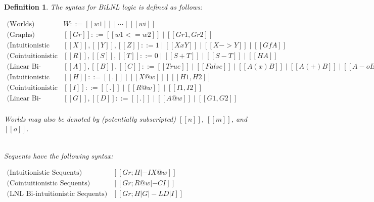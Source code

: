 \documentclass{lmcs}
\newtheorem{definition}[theorem]{Definition}
\begin{document}
\begin{definition}
  \label{def:BiLNL-syntax}
  The syntax for BiLNL logic is defined as follows:
  \begin{center}
    \begin{math}
      \begin{array}{rlllllllllll}
        \text{(Worlds)} & W ::= [[w1]] \mid \cdots \mid [[wi]]\\
        \text{(Graphs)} & [[Gr]] ::= [[w1 <= w2]] \mid [[Gr1 , Gr2]]\\
        \text{(Intuitionistic Formulas)} & [[X]], [[Y]], [[Z]] ::= 1
          \mid [[X x Y]] \mid [[X -> Y]] \mid [[Gf A]]\\
        \text{(Cointuitionistic Formulas)} &  [[R]], [[S]], [[T]] ::= 0 \mid [[S + T]] \mid [[S - T]] \mid [[H A]]\\
        \text{(Linear Bi-intuitionistic Formulas)} &
             [[A]],[[B]],[[C]] ::= [[True]] \mid [[False]] \mid
             [[A (x) B]] \mid [[A (+) B]] \mid
             [[A -o B]] \mid [[A *- B]] \mid [[F X]] \mid [[J S]]\\
             \text{(Intuitionistic Contexts)}  & [[H]] ::= [[.]] \mid
                  [[X @ w]] \mid [[H1 , H2]]\\
        \text{(Cointuitionistic Contexts)}  & [[I]] ::= [[.]] \mid
             [[R @ w]] \mid [[I1 , I2]]\\
        \text{(Linear Bi-intuitionistic Contexts)}  &
             [[G]],[[D]] ::= [[.]] \mid [[A @ w]] \mid [[G1,G2]]\\        
      \end{array}
    \end{math}
  \end{center}
  Worlds may also be denoted by (potentially subscripted) $[[n]]$,
  $[[m]]$, and $[[o]]$.

  \ \\
  \noindent
  Sequents have the following syntax:
  \begin{center}
    \begin{math}
      \begin{array}{rll}
        \text{(Intuitionistic Sequents)}   & [[Gr;H |-I X@w]]\\
        \text{(Cointuitionistic Sequents)} & [[Gr;R@w |-C I]]\\
        \text{(LNL Bi-intuitionistic Sequents)} & [[Gr;H | G |-L D | I]]\\
      \end{array}
    \end{math}
  \end{center}
\end{definition}
\end{document}
